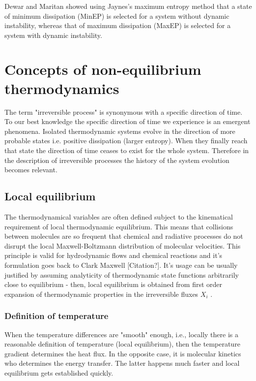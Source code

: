 \documentclass[a4paper,12pt,nofootinbib]{article}
\begin{document}
Dewar and Maritan \cite{Dewar:2014ek} showed using Jaynes's maximum entropy method that a state of minimum dissipation (MinEP) is selected for a system without dynamic instability, whereas that of maximum dissipation (MaxEP) is selected for a system with dynamic instability.

\newpage

\section{Concepts of non-equilibrium thermodynamics}
The term "irreversible process" is synonymous with a specific direction of time.
To our best knowledge the specific direction of time we experience is an emergent phenomena.
Isolated thermodynamic systems evolve in the direction of more probable states i.e. positive dissipation (larger entropy).
When they finally reach that state the direction of time ceases to exist for the whole system. 
Therefore in the description of irreversible processes the history of the system evolution becomes relevant.


\subsection{Local equilibrium}
The thermodynamical variables are often defined subject to the kinematical requirement of local thermodynamic equilibrium. This means that collisions between molecules are so frequent that chemical and radiative processes do not disrupt the local Maxwell-Boltzmann distribution of molecular velocities. This principle is valid for hydrodynamic flows and chemical reactions and it's formulation goes back to Clark Maxwell [Citation?].
It's usage can be usually justified by assuming analyticity of thermodynamic state functions arbitrarily close to equilibrium - then, local equilibrium is obtained from first order expansion of thermodynamic properties in the irreversible fluxes ${X_i}$ \cite{Evans:2002gg}.

\subsubsection{Definition of temperature}
When the temperature differences are "smooth" enough, i.e., locally there is a reasonable definition of temperature (local equilibrium), then the temperature gradient determines the heat flux. In the opposite case, it is molecular kinetics who determines the energy transfer. The latter happens much faster and local equilibrium gets established quickly.
\end{document}
